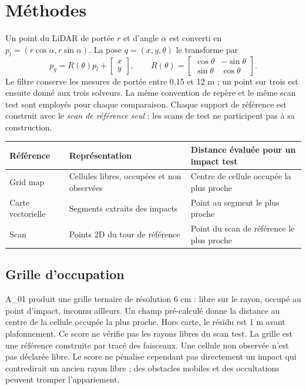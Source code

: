 \documentclass[11pt,a4paper]{article}
\begin{document}
\section{Méthodes}
Un point du LiDAR de portée $r$ et d'angle $\alpha$ est converti en
$p_l=(r\cos\alpha,r\sin\alpha)$. La pose $q=(x,y,\theta)$ le transforme par
\[
p_g=R(\theta)p_l+\begin{bmatrix}x\\y\end{bmatrix},\qquad
R(\theta)=\begin{bmatrix}\cos\theta&-\sin\theta\\
\sin\theta&\cos\theta\end{bmatrix}.
\]
Le filtre conserve les mesures de portée entre 0,15 et 12 m ; un point
sur trois est ensuite donné aux trois solveurs. La même convention de
repère et le même scan test sont employés pour chaque comparaison.
Chaque support de référence est construit avec le \emph{scan de référence
seul} : les scans de test ne participent pas à sa construction.
\begin{center}\small
\begin{tabular}{lp{4.0cm}p{5.2cm}}\toprule
Référence & Représentation & Distance évaluée pour un impact test\\\midrule
Grid map & Cellules libres, occupées et non observées & Centre de cellule occupée la plus proche\\
Carte vectorielle & Segments extraits des impacts & Point au segment le plus proche\\
Scan & Points 2D du tour de référence & Point du scan de référence le plus proche\\
\bottomrule\end{tabular}
\end{center}

\subsection{Grille d'occupation}
A\_01 produit une grille ternaire de résolution 6 cm : libre sur le rayon,
occupé au point d'impact, inconnu ailleurs. Un champ pré-calculé donne la
distance au centre de la cellule occupée la plus proche. Hors carte, le résidu
est 1 m avant plafonnement. Ce score ne vérifie pas les rayons libres du scan test.
La grille est une référence construite par tracé des faisceaux. Une cellule
non observée n'est pas déclarée libre. Le score ne pénalise cependant pas
directement un impact qui contredirait un ancien rayon libre ; des obstacles
mobiles et des occultations peuvent tromper l'appariement.
\end{document}
